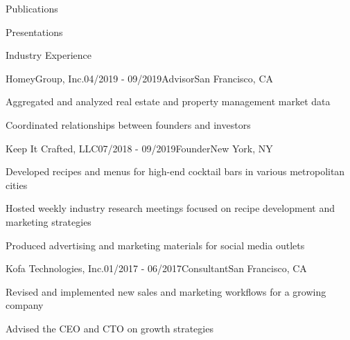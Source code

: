 \documentclass{cv} %
\begin{document}
\begin{cvSectionEmpty}{Publications}
   \printbibliography[
     heading=none,
     keyword=publications
   ]
\end{cvSectionEmpty}

\begin{cvSectionEmpty}{Presentations}
   \printbibliography[
     heading=none,
     keyword=talks
   ]
\end{cvSectionEmpty}


\begin{cvSection}{Industry Experience}

\begin{cvSubsectionWork}{HomeyGroup, Inc.}{04/2019 - 09/2019}{Advisor}{San Francisco, CA}
\item Aggregated and analyzed real estate and property management market data
\item Coordinated relationships between founders and investors
\end{cvSubsectionWork}


\begin{cvSubsectionWork}{Keep It Crafted, LLC}{07/2018 - 09/2019}{Founder}{New York, NY}
\item Developed recipes and menus for high-end cocktail bars in various metropolitan cities
\item Hosted weekly industry research meetings focused on recipe development and marketing strategies
\item Produced advertising and marketing materials for social media outlets
\end{cvSubsectionWork}


\begin{cvSubsectionWork}{Kofa Technologies, Inc.}{01/2017 - 06/2017}{Consultant}{San Francisco, CA}
\item Revised and implemented new sales and marketing workflows for a growing company
\item Advised the CEO and CTO on growth strategies
\end{cvSubsectionWork}



\end{cvSection}
\end{document}
